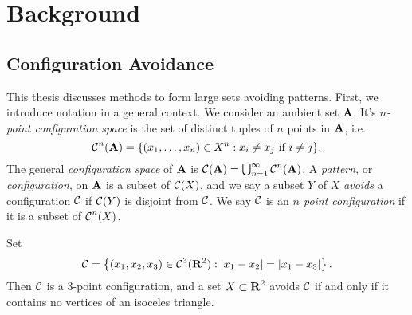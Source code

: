 
\chapter{Background}
\label{ch:Background}

\section{Configuration Avoidance}

This thesis discusses methods to form large sets avoiding patterns. First, we introduce notation in a general context. We consider an ambient set $\operatorname{\mathbf{A}}$. It's \emph{$n$-point configuration space} is the set of distinct tuples of $n$ points in $\operatorname{\mathbf{A}}$, i.e.
%
\[ \operatorname{\mathcal{C}}^n(\operatorname{\mathbf{A}}) = \{ (x_1, \dots, x_n) \in X^n: x_i \neq x_j\ \text{if $i \neq j$} \}. \]
%
The general \emph{configuration space} of $\operatorname{\mathbf{A}}$ is $\operatorname{\mathcal{C}}(\operatorname{\mathbf{A}}) = \bigcup_{n = 1}^\infty \operatorname{\mathcal{C}}^n(\operatorname{\mathbf{A}})$. A \emph{pattern}, or \emph{configuration}, on $\operatorname{\mathbf{A}}$ is a subset of $\operatorname{\mathcal{C}}(X)$, and we say a subset $Y$ of $X$ \emph{avoids} a configuration $\operatorname{\mathcal{C}}$ if $\operatorname{\mathcal{C}}(Y)$ is disjoint from $\operatorname{\mathcal{C}}$. We say $\operatorname{\mathcal{C}}$ is an \emph{$n$ point configuration} if it is a subset of $\operatorname{\mathcal{C}}^n(X)$.

\begin{example}
	Set
	\[ \operatorname{\mathcal{C}} = \left\{ (x_1, x_2, x_3) \in \operatorname{\mathcal{C}}^3(\operatorname{\mathbf{R}}^2) : |x_1-x_2| = |x_1-x_3| \right\}. \]
	Then $\operatorname{\mathcal{C}}$ is a 3-point configuration, and a set $X \subset \operatorname{\mathbf{R}}^2$ avoids $\operatorname{\mathcal{C}}$ if and only if it contains no vertices of an isoceles triangle. %
\end{example}


